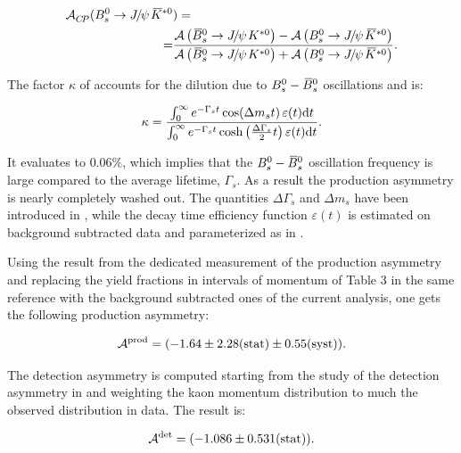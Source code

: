\begin{align}
\centering
  \Acp\;(\BsJpsiKst&) = \nonumber \\
  = &\frac{\totAmp{\BsbarJpsiKst} - \totAmp{\BsJpsiKst}}{\totAmp{\BsbarJpsiKst} + \totAmp{\BsJpsiKst}}.
\label{acp_corrected_amps}
\end{align}

\noindent The factor $\kappa$ of  accounts for the dilution due to $B^0_s-\kern 0.18em\overline{\kern -0.18em B}{}^0_s$
oscillations \cite{LHCb-PAPER-2013-018} and is:

\begin{equation}
  \centering
 \kappa = \frac{\int_0^\infty  e^{-\Gamma_s t} \cos \!\left( \Delta m_s t \right ) \varepsilon(t)\mathrm{d}t}{\int_0^\infty  e^{-\Gamma_s t} \cosh \left( \frac{\Delta \Gamma_s}{2} t \right ) \varepsilon(t)\mathrm{d}t}.
\label{kappa}
\end{equation}

\noindent It evaluates to $0.06\%$, which implies that the $B^0_s-\kern 0.18em\overline{\kern -0.18em B}{}^0_s$ oscillation frequency is large compared to the
average lifetime, $\Gamma_s$. As a result the production asymmetry is nearly completely washed out.
The quantities $\Delta\Gamma_s$ and $\Delta m_s$ have been introduced in ,
while the decay time efficiency function $\varepsilon(t)$ is estimated on background subtracted \BsJpsiKst
data and parameterized as in \cite{LHCb-PAPER-2014-053}.


Using the result from the dedicated \lhcb measurement of the production asymmetry \cite{LHCb-PAPER-2014-042}
and replacing the yield fractions in intervals of \Bs momentum of Table 3 in the same reference with the background
subtracted \BsJpsiKst ones of the current analysis, one gets the following production asymmetry:

\begin{equation}
    \centering
    \Aprod = (-1.64 \pm 2.28 \stat \pm 0.55 \syst).
  \label{prod_assym}
\end{equation}

\noindent The detection asymmetry is computed starting from the \lhcb study of the detection asymmetry
in \cite{LHCb-PAPER-2014-013} and weighting the kaon momentum distribution to much the observed
distribution in \BsJpsiKst data. The result is:

\begin{equation}
    \centering
    \Adet  = (-1.086 \pm 0.531 \stat).
  \label{det_assym}
\end{equation}

